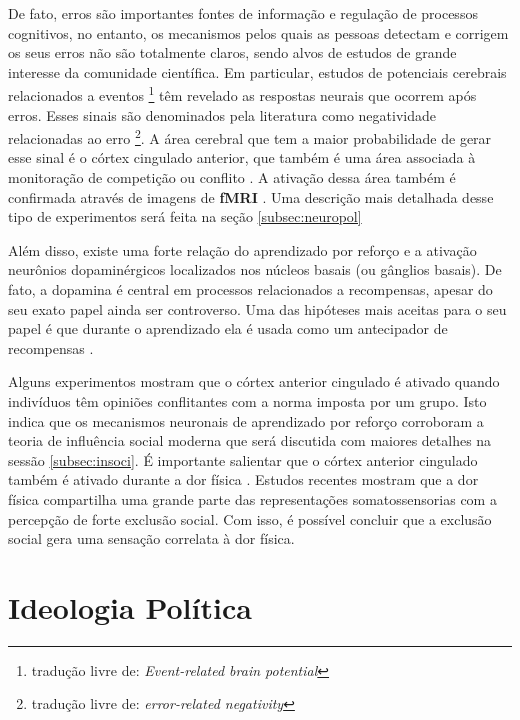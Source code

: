 De fato, erros são importantes fontes de informação e regulação de
processos cognitivos, no entanto, os mecanismos pelos quais as pessoas
detectam e corrigem os seus erros não são totalmente claros, sendo alvos 
de estudos de grande interesse da comunidade científica\cite{Yeung2004}.
Em particular, estudos de potenciais cerebrais relacionados a eventos
\footnote{ tradução livre de: \textit{Event-related brain potential} }
têm revelado as respostas neurais que ocorrem após erros. Esses sinais são
denominados pela literatura como negatividade relacionadas ao erro \footnote{
tradução livre de: \textit{error-related negativity} }. A área cerebral que
tem a maior probabilidade de gerar esse sinal é o córtex cingulado anterior,
que também é uma área associada à monitoração de competição ou conflito
\citep{Yeung2004}. A ativação dessa área também é confirmada através
de imagens de \textbf{fMRI} \citep{Yeung2004}. Uma descrição mais detalhada
desse tipo de experimentos será feita na seção \ref{subsec:neuropol}

Além disso, existe uma forte relação do aprendizado por reforço e a
ativação neurônios dopaminérgicos localizados nos núcleos basais (ou
gânglios basais)\citep{Holroyd2002,Redgrave2006b}. De fato, a dopamina é
central em processos relacionados a recompensas, apesar do seu exato papel
ainda ser controverso. Uma das hipóteses mais aceitas para o seu papel é
que durante o aprendizado ela é usada como um antecipador de recompensas
\citep{Flagel2011}.

Alguns experimentos \citep{Klucharev2009,Campbell-Meiklejohn2010} mostram
que o córtex anterior cingulado é ativado quando indivíduos têm
opiniões conflitantes com a norma imposta por um grupo.  Isto indica
que os mecanismos neuronais de aprendizado por reforço corroboram a
teoria de influência social moderna que será discutida com maiores
detalhes na sessão \ref{subsec:insoci}.  É importante salientar que
o córtex anterior cingulado também é ativado durante a dor física
\citep{Somerville2006,Eisenberger2003}. Estudos recentes mostram que a dor
física compartilha uma grande parte das representações somatossensorias
com a percepção de forte exclusão social\citep{Kross2011}. Com isso,
é possível concluir que a exclusão social gera uma sensação correlata
à dor física.

\section{Ideologia Política} %

